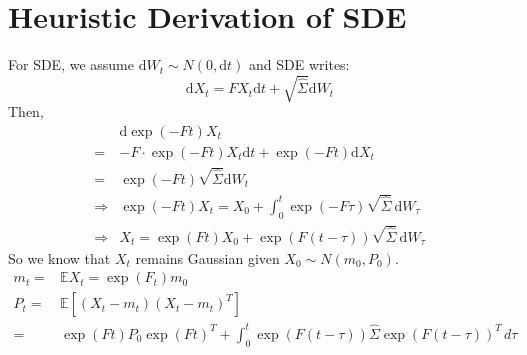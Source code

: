 \section{Heuristic Derivation of SDE}
For SDE, we assume $\mathrm{d}W_t \sim N(0,\mathrm{d}t)$ and SDE writes:
$$
\mathrm{d}X_t = FX_t\mathrm{d}t + \sqrt{\widehat{\Sigma } } \mathrm{d}W_t
$$
Then,
\begin{equation*}
    \begin{aligned}
        &\mathrm{d}\exp(-Ft)X_t\\
        =&-F\cdot\exp(-Ft)X_t\mathrm{d}t+\exp(-Ft)\mathrm{d}X_t\\
        =&\exp(-Ft)\sqrt{\widehat{\Sigma}}\mathrm{d}W_t\\
        \Rightarrow& \exp(-Ft)X_t = X_0+\int_{0}^{t}  \exp(-F\tau)\sqrt{\widehat{\Sigma}}\,\mathrm{d}W_\tau\\
        \Rightarrow& X_t = \exp(Ft)X_0+\exp(F(t-\tau))\sqrt{\widehat{\Sigma}}\,\mathrm{d}W_\tau
    \end{aligned}
\end{equation*}
So we know that $X_t$ remains Gaussian given $X_0 \sim N(m_0,P_0)$.
\begin{equation*}
    \begin{aligned}
        m_t=&\mathbb{E} X_t = \exp(F_t)m_0\\
        P_t=&\mathbb{E}\left[ (X_t-m_t)(X_t-m_t)^T \right] \\
        =&\exp(Ft)P_0\exp(Ft)^T + \int_{0}^{t} \exp(F(t-\tau))\widehat{\Sigma}\exp(F(t-\tau))^T \,d\tau
    \end{aligned}
\end{equation*}






